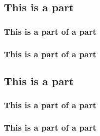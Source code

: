 \subsection{This is a part}
\subsubsection{This is a part of a part}
\subsubsection{This is a part of a part}

\subsection{This is a part}
\subsubsection{This is a part of a part}
\subsubsection{This is a part of a part}